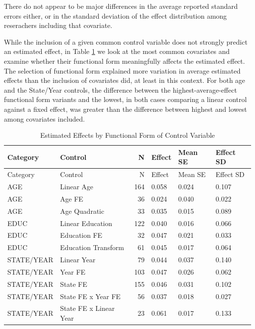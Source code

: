 \documentclass[
  letterpaper,
  DIV=11,
  numbers=noendperiod]{scrartcl}
\begin{document}
There do not appear to be major differences in the average reported
standard errors either, or in the standard deviation of the effect
distribution among reserachers including that covariate.

While the inclusion of a given common control variable does not strongly
predict an estimated effect, in Table
\ref{tab-effects-by-functional-form} we look at the most common
covariates and examine whether their functional form meaningfully
affects the estimated effect. The selection of functional form explained
more variation in average estimated effects than the inclusion of
covariates did, at least in this context. For both age and the
State/Year controls, the difference between the highest-average-effect
functional form variants and the lowest, in both cases comparing a
linear control against a fixed effect, was greater than the difference
between highest and lowest among covariates included.

\begin{longtable}[]{@{}llrlll@{}}
\caption{Estimated Effects by Functional Form of Control Variable
\label{tab-effects-by-functional-form}}\tabularnewline
\toprule\noalign{}
Category & Control & N & Effect & Mean SE & Effect SD \\
\midrule\noalign{}
\endfirsthead
\toprule\noalign{}
Category & Control & N & Effect & Mean SE & Effect SD \\
\midrule\noalign{}
\endhead
\bottomrule\noalign{}
\endlastfoot
AGE & Linear Age & 164 & 0.058 & 0.024 & 0.107 \\
AGE & Age FE & 36 & 0.024 & 0.040 & 0.022 \\
AGE & Age Quadratic & 33 & 0.035 & 0.015 & 0.089 \\
EDUC & Linear Education & 122 & 0.040 & 0.016 & 0.066 \\
EDUC & Education FE & 32 & 0.047 & 0.021 & 0.033 \\
EDUC & Education Transform & 61 & 0.045 & 0.017 & 0.064 \\
STATE/YEAR & Linear Year & 79 & 0.044 & 0.037 & 0.140 \\
STATE/YEAR & Year FE & 103 & 0.047 & 0.026 & 0.062 \\
STATE/YEAR & State FE & 155 & 0.046 & 0.031 & 0.102 \\
STATE/YEAR & State FE x Year FE & 56 & 0.037 & 0.018 & 0.027 \\
STATE/YEAR & State FE x Linear Year & 23 & 0.061 & 0.017 & 0.133 \\
\end{longtable}
\end{document}
